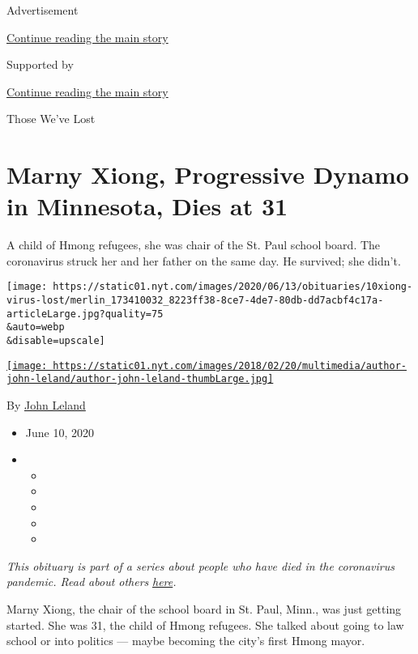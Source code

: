 Advertisement

\protect\hyperlink{after-top}{Continue reading the main story}

Supported by

\protect\hyperlink{after-sponsor}{Continue reading the main story}

Those We've Lost

\hypertarget{marny-xiong-progressive-dynamo-in-minnesota-dies-at-31}{%
\section{Marny Xiong, Progressive Dynamo in Minnesota, Dies at
31}\label{marny-xiong-progressive-dynamo-in-minnesota-dies-at-31}}

A child of Hmong refugees, she was chair of the St. Paul school board.
The coronavirus struck her and her father on the same day. He survived;
she didn't.~~

\texttt{[image: https://static01.nyt.com/images/2020/06/13/obituaries/10xiong-virus-lost/merlin\_173410032\_8223ff38-8ce7-4de7-80db-dd7acbf4c17a-articleLarge.jpg?quality=75\\\&auto=webp\\\&disable=upscale]}

\href{https://www.nytimes.com/by/john-leland}{\texttt{[image: https://static01.nyt.com/images/2018/02/20/multimedia/author-john-leland/author-john-leland-thumbLarge.jpg]}}

By \href{https://www.nytimes.com/by/john-leland}{John Leland}

\begin{itemize}
\item
  June 10, 2020
\item
  \begin{itemize}
  \item
  \item
  \item
  \item
  \item
  \end{itemize}
\end{itemize}

\emph{This obituary is part of a series about people who have died in
the coronavirus pandemic. Read about others}
\href{https://www.nytimes.com/interactive/2020/obituaries/people-died-coronavirus-obituaries.html}{\emph{here}}\emph{.}

Marny Xiong, the chair of the school board in St. Paul, Minn., was just
getting started. She was 31, the child of Hmong refugees. She talked
about going to law school or into politics --- maybe becoming the city's
first Hmong mayor.

